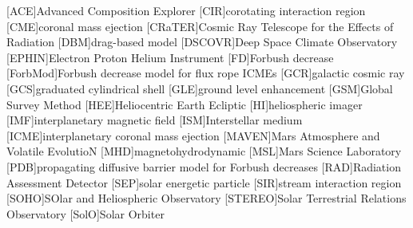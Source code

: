 	\begin{acronym}
	[ACE]{Advanced Composition Explorer}
	[CIR]{corotating interaction region}
	[CME]{coronal mass ejection}
	[CRaTER]{Cosmic Ray Telescope for the Effects of Radiation}
	[DBM]{drag-based model}
	[DSCOVR]{Deep Space Climate Observatory}
	[EPHIN]{Electron Proton Helium Instrument}
	[FD]{Forbush decrease}
	[ForbMod]{Forbush decrease model for flux rope ICMEs \cite{Dumbovic2018-ForbMod}}
	[GCR]{galactic cosmic ray}
	[GCS]{graduated cylindrical shell}
	[GLE]{ground level enhancement}
	[GSM]{Global Survey Method \cite{Belov-2005-GSM}}
	[HEE]{Heliocentric Earth Ecliptic}
	[HI]{heliospheric imager}
	[IMF]{interplanetary magnetic field}
    [ISM]{Interstellar medium}
	[ICME]{interplanetary coronal mass ejection}
	[MAVEN]{Mars Atmosphere and Volatile EvolutioN}
	[MHD]{magnetohydrodynamic}
	[MSL]{Mars Science Laboratory}
	[PDB]{propagating diffusive barrier model for Forbush decreases \cite{Wibberenz-1998}}
	[RAD]{Radiation Assessment Detector}
	[SEP]{solar energetic particle}
	[SIR]{stream interaction region}
	[SOHO]{SOlar and Heliospheric Observatory}
	[STEREO]{Solar Terrestrial Relations Observatory}
	[SolO]{Solar Orbiter}
	\end{acronym}
	

\endgroup

\cleardoublepage